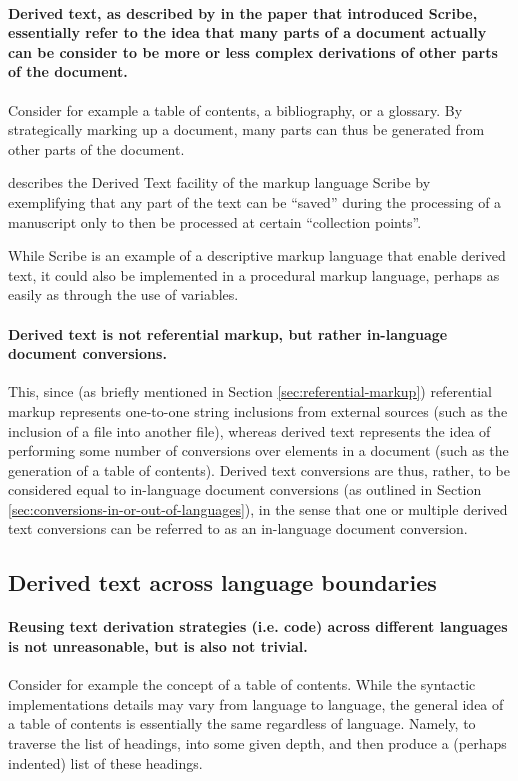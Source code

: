 \documentclass{scrreprt}
\begin{document}
\paragraph{Derived text, as described by \citet{reid} in the paper that introduced Scribe, essentially refer to the idea that many parts of a document actually can be consider to be more or less complex derivations of other parts of the document.} Consider for example a table of contents, a bibliography, or a glossary. By strategically marking up a document, many parts can thus be generated from other parts of the document.

\citet{reid} describes the Derived Text facility of the markup language Scribe by exemplifying that any part of the text can be ``saved'' during the processing of a manuscript only to then be processed at certain ``collection points''.

While Scribe is an example of a descriptive markup language that enable derived text, it could also be implemented in a procedural markup language, perhaps as easily as through the use of variables.

\paragraph{Derived text is not referential markup, but rather in-language document conversions. } This, since (as briefly mentioned in Section \ref{sec:referential-markup}) referential markup represents one-to-one string inclusions from external sources (such as the inclusion of a file into another file), whereas derived text represents the idea of performing some number of conversions over elements in a document (such as the generation of a table of contents). Derived text conversions are thus, rather, to be considered equal to in-language document conversions (as outlined in Section \ref{sec:conversions-in-or-out-of-languages}), in the sense that one or multiple derived text conversions can be referred to as an in-language document conversion.



\subsection{Derived text across language boundaries}
\paragraph{Reusing text derivation strategies (i.e. code) across different languages is not unreasonable, but is also not trivial.} Consider for example the concept of a table of contents. While the syntactic implementations details may vary from language to language, the general idea of a table of contents is essentially the same regardless of language. Namely, to traverse the list of headings, into some given depth, and then produce a (perhaps indented) list of these headings.
\end{document}

